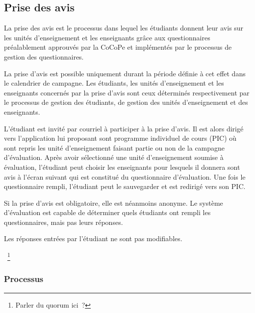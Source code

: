 \documentclass[a4paper,11pt]{report}
\begin{document}
\subsection{Prise des avis}
La prise des avis est le processus dans lequel les étudiants donnent leur avis sur les unités d'enseignement et les enseignants grâce aux questionnaires préalablement approuvés par la CoCoPe et implémentés par le processus de gestion des questionnaires.

La prise d'avis est possible uniquement durant la période définie à cet effet dans le calendrier de campagne.
Les étudiants, les unités d'enseignement et les enseignants concernés par la prise d'avis sont ceux déterminés respectivement par le processus de gestion des étudiants, de gestion des unités d'enseignement et des enseignants.

L'étudiant est invité par courriel à participer à la prise d'avis.
Il est alors dirigé vers l'application lui proposant sont programme individuel de cours (PIC) où sont repris les unité d'enseignement faisant partie ou non de la campagne d'évaluation.
Après avoir sélectionné une unité d'enseignement soumise à évaluation, l'étudiant peut choisir les enseignants pour lesquels il donnera sont avis à l'écran suivant qui est constitué du questionnaire d'évaluation.
Une fois le questionnaire rempli, l'étudiant peut le sauvegarder et est redirigé vers son PIC.

Si la prise d'avis est obligatoire, elle est néanmoins anonyme. Le système d'évaluation est capable de déterminer quels étudiants ont rempli les questionnaires, mais pas leurs réponses.

Les réponses entrées par l'étudiant ne sont pas modifiables.

~\footnote{Parler du quorum ici~?}

\subsubsection{Processus}
\end{document}
